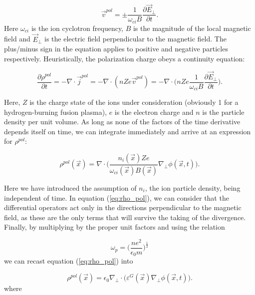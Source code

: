 \documentclass[]{report}   %
\begin{document}
\begin{equation}
\vec{v}^{pol} = \pm \frac{1}{\omega_{ci}B}\frac{\partial \vec{E}_{\perp}}{\partial t}.
\end{equation}
Here $\omega_{ci}$ is the ion cyclotron frequency, $B$ is the magnitude of the local magnetic field and $\vec{E}_{\perp}$ is the electric field perpendicular to the magnetic field. The plus/minus sign in the equation applies to positive and negative particles respectively. Heuristically, the polarization charge obeys a continuity equation:

\begin{equation} \label{eq:rho_pol_continuity}
\frac{\partial \rho^{pol} }{\partial t} = - \nabla \cdot \vec{j}^{pol} = - \nabla \cdot (nZe \vec{v}^{pol})=- \nabla \cdot \bigg( n Ze \frac{1}{\omega_{ci}B}\frac{\partial \vec{E}_{\perp}}{\partial t}\bigg) .
\end{equation}

Here, $Z$ is the charge state of the ions under consideration (obviously 1 for a hydrogen-burning fusion plasma), $e$ is the electron charge and $n$ is the particle density per unit volume. As long as none of the factors of the time derivative depends itself on time, we can integrate immediately and arrive at an expression for $\rho^{pol}$:

\begin{equation} \label{eq:rho_pol}
\rho^{pol}(\vec{x}) = \nabla \cdot \bigg( \frac{n_i(\vec{x})Ze}{\omega_{ci}(\vec{x}) B(\vec{x}) }\nabla_{\perp}\phi(\vec{x},t) \bigg).
\end{equation}

Here we have introduced the assumption of $n_i$, the ion particle density,  being independent of time. In equation (\ref{eq:rho_pol}), we can consider that the differential operators act only in the directions perpendicular to the magnetic field, as these are the only terms that will survive the taking of the divergence. Finally, by multiplying by the proper unit factors and using the relation

\begin{equation}
\omega_p = \bigg( \frac{ne^2} {\epsilon_0 m} \bigg)^{\frac{1}{2}}
\end{equation}
we can recast equation (\ref{eq:rho_pol}) into

\begin{equation} \label{eq:rho_pol_epsilon}
\rho^{pol}(\vec{x}) = \epsilon_0 \nabla_{\perp} \cdot \big( \varepsilon^G(\vec{x})\nabla_{\perp}\phi(\vec{x},t) \big).
\end{equation}
where 
\end{document}
